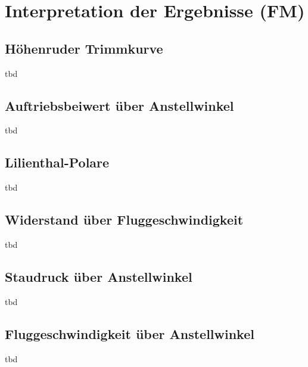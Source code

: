 \chapter{Interpretation der Ergebnisse (FM)}

\section{Höhenruder Trimmkurve}
tbd

\section{Auftriebsbeiwert über Anstellwinkel}
tbd

\section{Lilienthal-Polare}
tbd

\section{Widerstand über Fluggeschwindigkeit}
tbd

\section{Staudruck über Anstellwinkel}
tbd

\section{Fluggeschwindigkeit über Anstellwinkel}
tbd